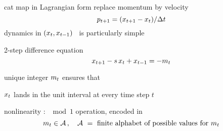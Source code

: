\begin{frame}{cat map in Lagrangian form
}
replace momentum by velocity
\[
p_{t+1}=(x_{t+1}  - x_{t})/\Delta t
\]
dynamics in $(x_{t},x_{t-1})$  \statesp\
is particularly simple
\begin{block}{2-step difference equation}
\[
x_{t+1}  -  s \, x_{t} + x_{t-1}
    =
-{m_{t}}
\] %
\end{block}
unique integer ${m_{t}}$
ensures that

\hfill $x_{t}$ lands in the unit interval at every time step $t$

\bigskip
nonlinearity : $ \mod 1$ operation, encoded in
\[
{m_{t}}\in  \mathcal{A}
\,,\quad \mathcal{A}\ = \mbox{ finite alphabet of possible values for } {\ensuremath{m_{t}}}
\]
\end{frame}

